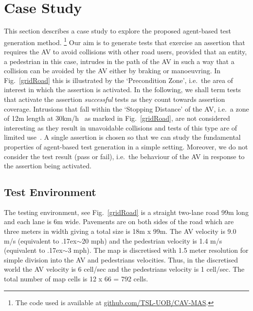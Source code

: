 \documentclass[letterpaper, 10 pt, journal, twoside]{IEEEtran}
\begin{document}
\section{Case Study} \label{s:case-study}
 
This section describes a case study to explore the proposed agent-based test generation method.%
\footnote{The code used is available at \url{github.com/TSL-UOB/CAV-MAS}.} %
%
Our aim is to generate tests that exercise an assertion that requires the AV to avoid collisions with other road users, provided that an entity, a pedestrian in this case, intrudes in the path of the AV in such a way that a collision can be avoided by the AV either by braking or manoeuvring. In Fig.~\ref{gridRoad} this is illustrated by the `Precondition Zone', i.e.\ the area of interest in which the assertion is activated.
%
In the following, we shall term tests that activate the assertion \textit{successful} tests as they count towards assertion coverage. 
%
Intrusions that fall within the `Stopping Distance' of the AV, i.e.\ a zone of 12m length at 30km/h~\cite{codes2015highway} as marked in Fig.~\ref{gridRoad}, are not considered interesting as they result in unavoidable collisions and tests of this type are of limited use~\cite{Tuncali2018}. 
%
%
A single assertion is chosen so that we can study the fundamental properties of agent-based test generation in a simple setting.
%
Moreover, we do not consider the test result (pass or fail), i.e.\ the behaviour of the AV in response to the assertion being activated. 


\subsection{Test Environment}
The testing environment, see Fig.~\ref{gridRoad} is a straight two-lane road 99m long and each lane is 6m wide. Pavements are on both sides of the road which are three meters in width giving a total size is 18m x 99m. 
%
The AV velocity is 9.0 m/s (equivalent to {\raise.17ex\hbox{$\scriptstyle\sim$}}20 mph) and the pedestrian velocity is 1.4 m/s (equivalent to {\raise.17ex\hbox{$\scriptstyle\sim$}}3 mph). The map is discretised with 1.5 meter resolution for simple division into the AV and pedestrians velocities. Thus, in the discretised world the AV velocity is 6 cell/sec and the pedestrians velocity is 1 cell/sec. The total number of map cells is 12 x 66 = 792 cells. 
\end{document}
